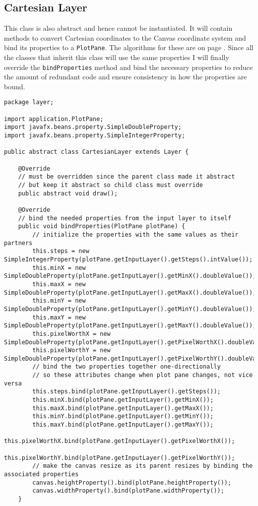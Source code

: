 \documentclass[../../../../main.tex]{subfiles}
\begin{document}
\subsection{Cartesian Layer}
This class is also abstract and hence cannot be instantiated. It will contain methods to convert Cartesian coordinates to the Canvas coordinate system and bind its properties to a \texttt{PlotPane}. The algorithms for these are on page \pageref{alg:coordConv}. Since all the classes that inherit this class will use the same properties I will finally override the \texttt{bindProperties{}} method and bind the necessary properties to reduce the amount of redundant code and ensure consistency in how the properties are bound.
\begin{verbatim}
package layer;

import application.PlotPane;
import javafx.beans.property.SimpleDoubleProperty;
import javafx.beans.property.SimpleIntegerProperty;

public abstract class CartesianLayer extends Layer {

	@Override
	// must be overridden since the parent class made it abstract
	// but keep it abstract so child class must override
	public abstract void draw();

	@Override
	// bind the needed properties from the input layer to itself
	public void bindProperties(PlotPane plotPane) {
		// initialize the properties with the same values as their partners
		this.steps = new SimpleIntegerProperty(plotPane.getInputLayer().getSteps().intValue());
		this.minX = new SimpleDoubleProperty(plotPane.getInputLayer().getMinX().doubleValue());
		this.maxX = new SimpleDoubleProperty(plotPane.getInputLayer().getMaxX().doubleValue());
		this.minY = new SimpleDoubleProperty(plotPane.getInputLayer().getMinY().doubleValue());
		this.maxY = new SimpleDoubleProperty(plotPane.getInputLayer().getMaxY().doubleValue());
		this.pixelWorthX = new SimpleDoubleProperty(plotPane.getInputLayer().getPixelWorthX().doubleValue());
		this.pixelWorthY = new SimpleDoubleProperty(plotPane.getInputLayer().getPixelWorthY().doubleValue());
		// bind the two properties together one-directionally
		// so these attributes change when plot pane changes, not vice versa
		this.steps.bind(plotPane.getInputLayer().getSteps());
		this.minX.bind(plotPane.getInputLayer().getMinX());
		this.maxX.bind(plotPane.getInputLayer().getMaxX());
		this.minY.bind(plotPane.getInputLayer().getMinY());
		this.maxY.bind(plotPane.getInputLayer().getMaxY());
		this.pixelWorthX.bind(plotPane.getInputLayer().getPixelWorthX());
		this.pixelWorthY.bind(plotPane.getInputLayer().getPixelWorthY());
		// make the canvas resize as its parent resizes by binding the associated properties
		canvas.heightProperty().bind(plotPane.heightProperty());
		canvas.widthProperty().bind(plotPane.widthProperty());
	}


\end{verbatim}
\end{document}

